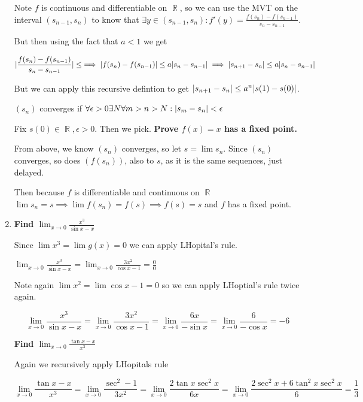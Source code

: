 \documentclass[10pt,a4paper]{article}
\DeclareMathOperator*{\R}{\mathbb{R}}
\DeclarePairedDelimiter{\abs}{\lvert}{\rvert}
\begin{document}
\begin{enumerate}
        Note $f$ is continuous and differentiable on $\R$, so we can use the MVT on the interval $(s_{n-1}, s_n)$ to know that $\exists y \in (s_{n-1}, s_n) : f'(y) = \frac{f(s_n) - f(s_{n-1})}{s_n - s_{n-1}}$.

        But then using the fact that $a < 1 $ we get 

        $$\abs{\frac{f(s_n) - f(s_{n-1})}{s_n - s_{n-1}}} \leq  \implies \abs{f(s_n) - f(s_{n-1})} \leq a \abs{s_n - s_{n-1}} \implies \abs{s_{n+1} -s_n} \leq a \abs{s_n - s_{n-1}}$$

        But we can apply this recursive defintion to get $\abs{s_{n+1} -s_n} \leq a^n \abs{s(1)-s(0)}$.

        $(s_n)$ converges if $\forall \epsilon > 0 \exists N \forall m > n > N: \abs{s_m - s_n} < \epsilon$

        Fix $s(0) \in \R, \epsilon>0$. Then we pick.
    \textbf{ Prove $f(x)= x$ has a fixed point.}

        From above, we know $(s_n)$ converges, so let $s = \lim s_n$. Since $(s_n)$ converges, so does $(f(s_n))$, also to $s$, as it is the same sequences, just delayed.

        Then because $f$ is differentiable and continuous on $\R$ $\lim s_n = s \implies \lim f(s_n)= f(s) \implies f(s) = s$ and $f$ has a fixed point.

    \item \textbf{Find $\lim_{x \to 0} \frac{x^3}{\sin x - x}$}

        Since $\lim x^3 = \lim g(x) = 0$ we can apply LHopital's rule.

        $\lim_{x \to 0} \frac{x^3}{\sin x - x} = \lim_{x \to 0} \frac{3x^2}{\cos x - 1} = \frac{0}{0}$

        Note again $\lim x^2 = \lim \cos x -1 = 0$ so we can apply LHoptial's rule twice again.

        $$\lim_{x \to 0} \frac{x^3}{\sin x - x} = \lim_{x \to 0} \frac{3x^2}{\cos x - 1} = \lim_{x \to 0} \frac{6x}{-\sin x} = \lim_{x \to 0} \frac{6}{-\cos x} = -6$$

    \textbf{Find $\lim_{x \to 0} \frac{\tan x - x}{x^3}$}

        Again we recursively apply LHopitals rule

        $$\lim_{x \to 0} \frac{\tan x -x}{ x^3} = \lim_{x \to 0}\frac{\sec^2 -1}{3x^2} = \lim_{x \to 0} \frac{2 \tan x \sec^2 x }{6x} = \lim_{x \to 0} \frac{2 \sec^2 x + 6 \tan^2 x \sec^2 x}{6} = \frac{1}{3}$$


\end{enumerate}
\end{document}

